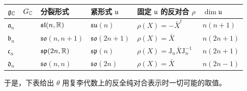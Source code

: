
\begin{table}[htbp]
\centering
\small
\begin{tabular}{llllll}
\toprule
$\mathfrak{g}_{\mathbb{C}}$ & $G_{\mathbb{C}}$ & 分裂形式 & 紧形式 $\mathfrak{u}$ & 固定 $\mathfrak{u}$ 的反对合 $\rho$ & $\dim\mathfrak{u}$ \\
\midrule
$\mathfrak{a}_n$ & & $\mathfrak{sl}(n,\mathbb{R})$ & $\mathfrak{su}(n)$ & $\rho(X)=-\bar{X}^t$ & $n(n+1)$ \\
$\mathfrak{b}_n$ & & $\mathfrak{so}(n,n+1)$ & $\mathfrak{so}(2n+1)$ & $\rho(X)=\bar{X}$ & $n(2n+1)$ \\
$\mathfrak{c}_n$ & & $\mathfrak{sp}(2n,\mathbb{R})$ & $\mathfrak{sp}(n)$ & $\rho(X)=\mathrm{J}_n\bar{X}\mathrm{J}_n^{-1}$ & $n(2n+1)$ \\
$\mathfrak{d}_n$ & & $\mathfrak{so}(n,n)$ & $\mathfrak{so}(2n)$ & $\rho(X)=\bar{X}$ & $n(2n-1)$ \\
\bottomrule
\end{tabular}
\end{table}


于是，下表给出 $\theta$ 用复李代数上的反全纯对合表示时一切可能的取值。

